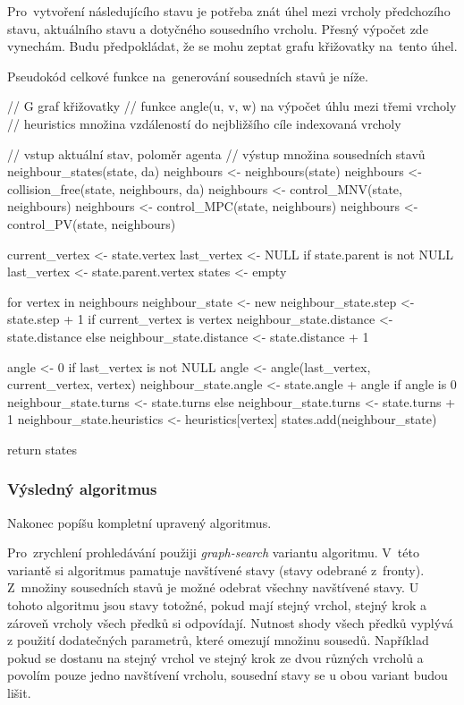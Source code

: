 Pro~vytvoření následujícího stavu je potřeba znát
úhel mezi vrcholy předchozího stavu, aktuálního stavu a dotyčného sousedního vrcholu.
Přesný výpočet zde vynechám.
Budu předpokládat, že se mohu zeptat grafu křižovatky na~tento úhel.

Pseudokód celkové funkce na~generování sousedních stavů je níže.


\begin{code}[fontsize=\footnotesize]
// G graf křižovatky
// funkce angle(u, v, w) na výpočet úhlu mezi třemi vrcholy
// heuristics množina vzdáleností do nejbližšího cíle indexovaná vrcholy

// vstup aktuální stav, poloměr agenta
// výstup množina sousedních stavů
neighbour_states(state, da)
  neighbours <- neighbours(state)
  neighbours <- collision_free(state, neighbours, da)
  neighbours <- control_MNV(state, neighbours)
  neighbours <- control_MPC(state, neighbours)
  neighbours <- control_PV(state, neighbours)

  current_vertex <- state.vertex
  last_vertex <- NULL
  if state.parent is not NULL
    last_vertex <- state.parent.vertex
  states <- empty

  for vertex in neighbours
    neighbour_state <- new
    neighbour_state.step <- state.step + 1
    if current_vertex is vertex
      neighbour_state.distance <- state.distance
    else
      neighbour_state.distance <- state.distance + 1

    angle <- 0
    if last_vertex is not NULL
      angle <- angle(last_vertex, current_vertex, vertex)
    neighbour_state.angle <- state.angle + angle
    if angle is 0
      neighbour_state.turns <- state.turns
    else
      neighbour_state.turns <- state.turns + 1
    neighbour_state.heuristics <- heuristics[vertex]
    states.add(neighbour_state)

  return states
\end{code}

\subsubsection{Výsledný algoritmus}\label{subsubsec:ars_vysledny_algoritmus}

Nakonec popíšu kompletní upravený  algoritmus.

Pro~zrychlení prohledávání použiji \emph{graph-search} variantu  algoritmu.
V~této variantě si algoritmus pamatuje navštívené stavy (stavy odebrané z~fronty).
Z~množiny sousedních stavů je možné odebrat všechny navštívené stavy.
U tohoto algoritmu jsou stavy totožné, pokud mají stejný vrchol, stejný krok a zároveň vrcholy všech předků si odpovídají.
Nutnost shody všech předků vyplývá z použití dodatečných parametrů, které omezují množinu sousedů.
Například pokud se dostanu na stejný vrchol ve stejný krok ze dvou různých vrcholů
a povolím pouze jedno navštívení vrcholu, sousední stavy se u obou variant budou lišit.

